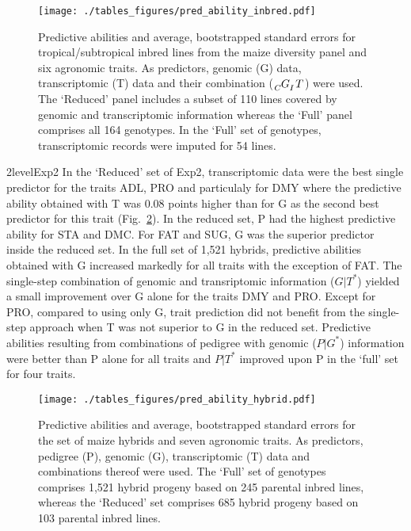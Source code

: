 \documentclass[12pt,titlepage]{article}
\begin{document}
\begin{figure}[H]
  \centering
  \texttt{[image: ./tables\_figures/pred\_ability\_inbred.pdf]}
  \caption{
  Predictive abilities and average, bootstrapped standard errors for
  tropical/subtropical inbred lines from the maize diversity panel and six
  agronomic traits.
  As predictors, genomic (G) data, transcriptomic (T) data and their 
  combination ($\tensor[_{C}]{G}{}\tensor[_{I}]{T}{}$) were used.
  The `Reduced' panel includes a subset of 110 lines covered by genomic and
  transcriptomic information whereas the `Full' panel comprises all 164
  genotypes.
  In the `Full' set of genotypes, transcriptomic records were imputed for 54
  lines.
  }
\label{fig:InbredResults}
\end{figure}



\Genetics2level{Exp2}
In the `Reduced' set of Exp2, transcriptomic data were the best single predictor
for the traits ADL, PRO and particulaly for DMY where the predictive ability
obtained with T was 0.08 points higher than for G as the second best predictor for
this trait (Fig.~\ref{fig:HybridResults}).
In the reduced set, P had the highest predictive ability for STA and DMC\@.
For FAT and SUG, G was the superior predictor inside the reduced set.
In the full set of 1,521 hybrids, predictive abilities obtained with G increased
markedly for all traits with the exception of FAT\@.
The single-step combination of genomic and transriptomic information
($G|T^{*}$) yielded a small improvement over G alone for the traits DMY and PRO\@.
Except for PRO, compared to using only G, trait prediction did not benefit from 
the single-step approach when T was not superior to G in the reduced set.
Predictive abilities resulting from combinations of pedigree with genomic
($P|G^{*}$) information were better than P alone for all traits and $P|T^{*}$
improved upon P in the `full' set for four traits.

\begin{figure}[H]
\centering
  \texttt{[image: ./tables\_figures/pred\_ability\_hybrid.pdf]}
  \caption{
    Predictive abilities and average, bootstrapped standard errors for the set
    of maize hybrids and seven agronomic traits.
    As predictors, pedigree (P), genomic (G), transcriptomic (T) data and 
    combinations thereof were used.
    The `Full' set of genotypes comprises 1,521 hybrid progeny based on 245
    parental inbred lines, whereas the `Reduced' set comprises 685 hybrid
    progeny based on 103 parental inbred lines.
  }
\label{fig:HybridResults}
\end{figure}
\end{document}
